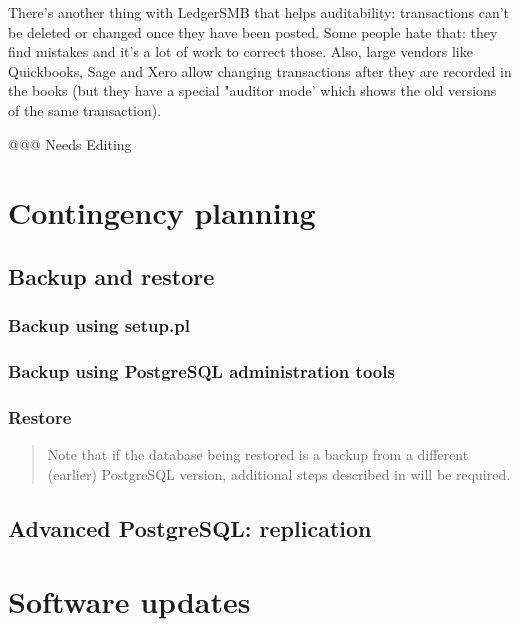 There's another thing with LedgerSMB that helps auditability: transactions can't be deleted or changed once they have been posted. Some people hate that: they find mistakes and it's a lot of work to correct those. Also, large vendors like Quickbooks, Sage and Xero allow changing transactions after they are recorded in the books (but they have a special "auditor mode' which shows the old versions of the same transaction).

@@@ Needs Editing

\chapter{Contingency planning}
\label{cha-contingency}

\section{Backup and restore}
\label{sec-contingency-backup-restore}

\subsection{Backup using setup.pl}
\label{subsec-contingency-backup-setup-pl}


\subsection{Backup using PostgreSQL administration tools}
\label{subsec-contingency-backup-psql}

\subsection{Restore}
\label{subsec-contingency-restore}

\begin{quote}
Note that if the database being restored is a backup from a different (earlier) PostgreSQL version,
additional steps described in  will be required.
\end{quote}




\section{Advanced PostgreSQL: replication}
\label{sec-contingency-replication}


\chapter{Software updates}
\label{cha-software-updates}

